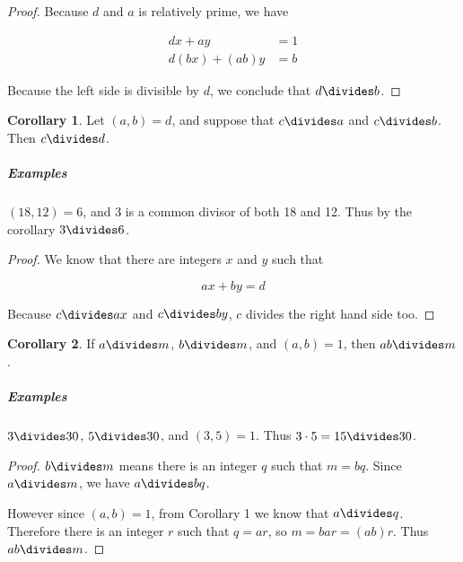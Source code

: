 \documentclass{article}
\theoremstyle{definition} %
\theoremstyle{definition}
\newtheorem{corollary}{Corollary}[theorem] %
\theoremstyle{definition}
\theoremstyle{definition}
\begin{document}
  \begin{proof}
    Because $d$ and $a$ is relatively prime, we have
    
    \begin{align*}
      dx + ay &= 1 \\
      d(bx) + (ab)y &= b
    \end{align*}
    
    Because the left side is divisible by $d$, we conclude that $d \divides b$.
  \end{proof}
  
  \begin{corollary}
    Let $(a, b) = d$, and suppose that $c \divides a$ and $c \divides b$.
    Then $c \divides d$.
  \end{corollary}
  
  \subparagraph{Examples} $(18, 12) = 6$, and 3 is a common divisor
  of both 18 and 12. Thus by the corollary $3 \divides 6$.
  
  \begin{proof}
    We know that there are integers $x$ and $y$ such that
    
    \begin{equation*}
      ax + by = d
    \end{equation*}
    
    Because $c \divides ax$ and $c \divides by$, $c$ divides the right hand side too.
  \end{proof}
  
  \begin{corollary}
    If $a \divides m$, $b \divides m$, and $(a, b) = 1$, then $ab \divides m$.
  \end{corollary}
  
  \subparagraph{Examples} $3 \divides 30$, $5 \divides 30$, and $(3, 5) = 1$. Thus $3 \cdot 5 = 15 \divides 30$.
  
  \begin{proof}
    $b \divides m$ means there is an integer $q$ such that $m = bq$.
    Since $a \divides m$, we have $a \divides bq$.
    
    However since $(a, b) = 1$, from Corollary 1 we know that $a \divides q$. Therefore
    there is an integer $r$ such that $q = ar$, so $m = bar = (ab) r$. Thus $ab \divides m$.
  \end{proof}
  
\end{document}
